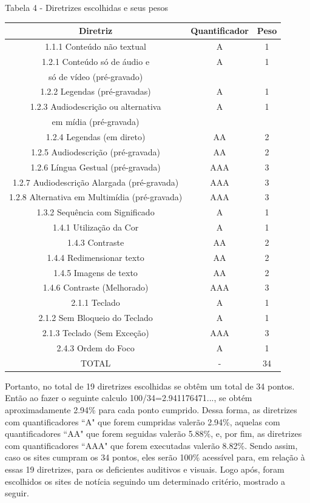 \documentclass[a4paper]{article}
\begin{document}
\begin{titlepage}
Tabela 4 - Diretrizes escolhidas e seus pesos\\[-1cm]
\begin{center}
	\begin{longtable}{|c|c|c|}
		\hline
		Diretriz & Quantificador & Peso\\
		\hline
		1.1.1 Conteúdo não textual & A & 1\\
		\hline
		1.2.1 Conteúdo só de áudio e & A & 1\\
		só de vídeo (pré-gravado) & & \\
		\hline
		1.2.2 Legendas (pré-gravadas) & A & 1\\
		\hline
		1.2.3 Audiodescrição ou alternativa & A & 1\\
		em mídia (pré-gravada) & & \\
		\hline
		1.2.4 Legendas (em direto) & AA & 2\\
		\hline
		1.2.5 Audiodescrição (pré-gravada) & AA & 2\\
		\hline
		1.2.6 Língua Gestual (pré-gravada) & AAA & 3\\
		\hline
		1.2.7 Audiodescrição Alargada (pré-gravada) & AAA & 3\\
		\hline
		1.2.8 Alternativa em Multimídia (pré-gravada) & AAA & 3\\
		\hline
		1.3.2 Sequência com Significado & A & 1\\
		\hline
		1.4.1 Utilização da Cor & A & 1\\
		\hline
		1.4.3 Contraste & AA & 2\\
		\hline
		1.4.4 Redimensionar texto & AA & 2\\
		\hline
		1.4.5 Imagens de texto & AA & 2\\
		\hline
		1.4.6 Contraste (Melhorado) & AAA & 3\\
		\hline
		2.1.1 Teclado & A & 1\\
		\hline
		2.1.2 Sem Bloqueio do Teclado & A & 1\\
		\hline
		2.1.3 Teclado (Sem Exceção) & AAA & 3\\
		\hline
		2.4.3 Ordem do Foco & A & 1\\
		\hline
		TOTAL & - & 34\\
		\hline
	\end{longtable}
\end{center}

Portanto, no total de 19 diretrizes escolhidas se obtêm um total de 34 pontos. Então ao fazer o seguinte calculo 100/34=2.941176471..., se obtém aproximadamente 2.94\% para cada ponto cumprido. Dessa forma, as diretrizes com quantificadores ``A" que forem cumpridas valerão 2.94\%, aquelas com quantificadores ``AA" que forem seguidas valerão 5.88\%, e, por fim, as diretrizes com quantificadores ``AAA" que forem executadas valerão 8.82\%. Sendo assim, caso os sites cumpram os 34 pontos, eles serão 100\% acessível para, em relação à essas 19 diretrizes, para os deficientes auditivos e visuais. Logo após, foram escolhidos os sites de notícia seguindo um determinado critério, mostrado a seguir.


\end{titlepage}
\end{document}
